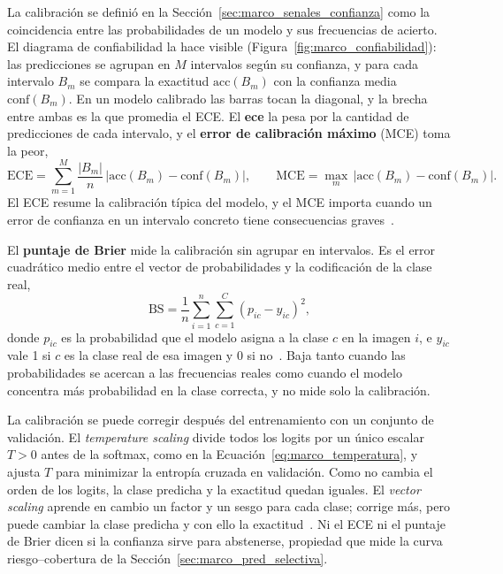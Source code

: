 La calibración se definió en la Sección~\ref{sec:marco_senales_confianza} como la coincidencia entre las
probabilidades de un modelo y sus frecuencias de acierto. El diagrama de confiabilidad la hace visible
(Figura~\ref{fig:marco_confiabilidad}): las predicciones se agrupan en $M$ intervalos según su confianza, y
para cada intervalo $B_m$ se compara la exactitud $\mathrm{acc}(B_m)$ con la confianza media
$\mathrm{conf}(B_m)$. En un modelo calibrado las barras tocan la diagonal, y la brecha entre ambas es la que
promedia el ECE. El \textbf{\gls{ece}} la pesa por la cantidad de predicciones de cada intervalo, y el
\textbf{error de calibración máximo} (MCE) toma la peor,
\begin{equation}
    \mathrm{ECE} = \sum_{m=1}^{M} \frac{|B_m|}{n}\,\bigl|\mathrm{acc}(B_m) - \mathrm{conf}(B_m)\bigr|,
    \qquad
    \mathrm{MCE} = \max_{m}\,\bigl|\mathrm{acc}(B_m) - \mathrm{conf}(B_m)\bigr|.
    \label{eq:marco_ece}
\end{equation}
El ECE resume la calibración típica del modelo, y el MCE importa cuando un error de confianza en un intervalo
concreto tiene consecuencias graves~\cite{guo2017calibration}.

El \textbf{puntaje de Brier} mide la calibración sin agrupar en intervalos. Es el error cuadrático medio entre
el vector de probabilidades y la codificación de la clase real,
\begin{equation}
    \mathrm{BS} = \frac{1}{n}\sum_{i=1}^{n}\sum_{c=1}^{C} \left(p_{ic} - y_{ic}\right)^2,
    \label{eq:marco_brier}
\end{equation}
donde $p_{ic}$ es la probabilidad que el modelo asigna a la clase $c$ en la imagen $i$, e $y_{ic}$ vale 1 si
$c$ es la clase real de esa imagen y 0 si no~\cite{brier1950verification}. Baja tanto cuando las
probabilidades se acercan a las frecuencias reales como cuando el modelo concentra más probabilidad en la
clase correcta, y no mide solo la calibración.



La calibración se puede corregir después del entrenamiento con un conjunto de validación. El \emph{temperature
scaling} divide todos los logits por un único escalar $T>0$ antes de la softmax, como en la
Ecuación~\ref{eq:marco_temperatura}, y ajusta $T$ para minimizar la entropía cruzada en validación. Como no
cambia el orden de los logits, la clase predicha y la exactitud quedan iguales. El \emph{vector scaling}
aprende en cambio un factor y un sesgo para cada clase; corrige más, pero puede cambiar la clase predicha y
con ello la exactitud~\cite{guo2017calibration}. Ni el ECE ni el puntaje de Brier dicen si la confianza sirve
para abstenerse, propiedad que mide la curva riesgo--cobertura de la Sección~\ref{sec:marco_pred_selectiva}.

